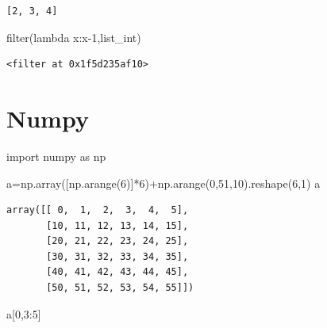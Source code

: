 \documentclass[
  letterpaper,
  DIV=11,
  numbers=noendperiod]{scrreprt}
\newenvironment{Shaded}{\begin{snugshade}}{\end{snugshade}}
\newcommand{\BuiltInTok}[1]{\textcolor[rgb]{0.00,0.23,0.31}{#1}}
\newcommand{\DecValTok}[1]{\textcolor[rgb]{0.68,0.00,0.00}{#1}}
\newcommand{\ImportTok}[1]{\textcolor[rgb]{0.00,0.46,0.62}{#1}}
\newcommand{\KeywordTok}[1]{\textcolor[rgb]{0.00,0.23,0.31}{#1}}
\newcommand{\NormalTok}[1]{\textcolor[rgb]{0.00,0.23,0.31}{#1}}
\newcommand{\OperatorTok}[1]{\textcolor[rgb]{0.37,0.37,0.37}{#1}}
\begin{document}
\begin{verbatim}
[2, 3, 4]
\end{verbatim}

\begin{Shaded}
\begin{Highlighting}[]
\BuiltInTok{filter}\NormalTok{(}\KeywordTok{lambda}\NormalTok{ x:x}\OperatorTok{{-}}\DecValTok{1}\NormalTok{,list\_int)}
\end{Highlighting}
\end{Shaded}

\begin{verbatim}
<filter at 0x1f5d235af10>
\end{verbatim}

\chapter{Numpy}\label{numpy}

\begin{Shaded}
\begin{Highlighting}[]
\ImportTok{import}\NormalTok{ numpy }\ImportTok{as}\NormalTok{ np}
\end{Highlighting}
\end{Shaded}

\begin{Shaded}
\begin{Highlighting}[]
\NormalTok{a}\OperatorTok{=}\NormalTok{np.array([np.arange(}\DecValTok{6}\NormalTok{)]}\OperatorTok{*}\DecValTok{6}\NormalTok{)}\OperatorTok{+}\NormalTok{np.arange(}\DecValTok{0}\NormalTok{,}\DecValTok{51}\NormalTok{,}\DecValTok{10}\NormalTok{).reshape(}\DecValTok{6}\NormalTok{,}\DecValTok{1}\NormalTok{)}
\NormalTok{a}
\end{Highlighting}
\end{Shaded}

\begin{verbatim}
array([[ 0,  1,  2,  3,  4,  5],
       [10, 11, 12, 13, 14, 15],
       [20, 21, 22, 23, 24, 25],
       [30, 31, 32, 33, 34, 35],
       [40, 41, 42, 43, 44, 45],
       [50, 51, 52, 53, 54, 55]])
\end{verbatim}

\begin{Shaded}
\begin{Highlighting}[]
\NormalTok{a[}\DecValTok{0}\NormalTok{,}\DecValTok{3}\NormalTok{:}\DecValTok{5}\NormalTok{]}
\end{Highlighting}
\end{Shaded}
\end{document}
